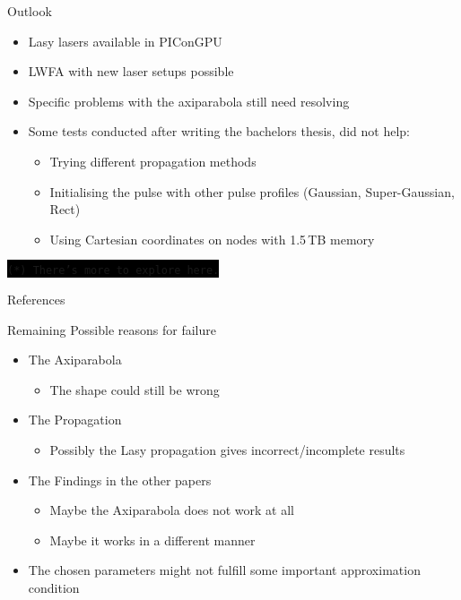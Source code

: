 \documentclass[
  nonavigation,
  aspectratio=43, %
  10pt
]{beamer}
\begin{document}
\begin{frame}{Outlook}
    \begin{itemize}
        \item Lasy lasers available in PIConGPU
        \item[$\rightarrow$] LWFA with new laser setups possible
        \item Specific problems with the axiparabola still need resolving
        \item Some tests conducted after writing the bachelors thesis, did not help:\begin{itemize}
            \item Trying different propagation methods
            \item Initialising the pulse with other pulse profiles (Gaussian, Super-Gaussian, Rect)
            \item Using Cartesian coordinates on nodes with 1.5\,TB memory 
        \end{itemize}
    \end{itemize}
    \vspace*{20pt}
    \colorbox{black}{\textcolor{ow}{\texttt{(*) There's more to explore here.}}}
\end{frame}

\begin{frame}[allowframebreaks]{References}
    
    
\end{frame}

\begin{frame}{Remaining Possible reasons for failure}
    \begin{itemize}
    \item The Axiparabola\begin{itemize}
        \item The shape could still be wrong
    \end{itemize}
    \item The Propagation\begin{itemize}
        \item Possibly the Lasy propagation gives incorrect/incomplete results
    \end{itemize}
    \item The Findings in the other papers\begin{itemize}
        \item Maybe the Axiparabola does not work at all
        \item Maybe it works in a different manner
    \end{itemize}
    \item The chosen parameters might not fulfill some important approximation condition
    \end{itemize}
\end{frame}
\end{document}

